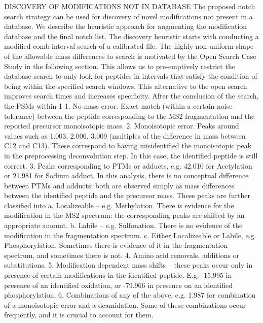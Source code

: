 \documentclass[journal=jprobs,manuscript=article]{achemso}
\begin{document}
DISCOVERY OF MODIFICATIONS NOT IN DATABASE
The proposed notch search strategy can be used for discovery of novel modifications not present in a database. We describe the heuristic approach for augmenting the modification database and the final notch list. 
The discovery heuristic starts with conducting a modified comb interval search of a calibrated file. The highly non-uniform shape of the allowable mass differences to search is motivated by the Open Search Case Study in the following section. This allows us to pre-emptively restrict the database search to only look for peptides in intervals that satisfy the condition of being within the specified search windows. This alternative to the open search improves search times and increases specificity.
After the conclusion of the search, the PSMs within 1%
1.	No mass error. Exact match (within a certain noise tolerance) between the peptide corresponding to the MS2 fragmentation and the reported precursor monoisotopic mass.
2.	Monoisotopic error. Peaks around values such as 1.003, 2.006, 3.009 (multiples of the difference in mass between C12 and C13). These correspond to having misidentified the monoisotopic peak in the preprocessing deconvolution step. In this case, the identified peptide is still correct. 
3.	Peaks corresponding to PTMs or adducts, e.g. 42.010 for Acetylation or 21.981 for Sodium adduct. In this analysis, there is no conceptual difference between PTMs and adducts: both are observed simply as mass differences between the identified peptide and the precursor mass.  These peaks are further classified into
a.	Localizeable – e.g. Methylation. There is evidence for the modification in the MS2 spectrum: the corresponding peaks are shifted by an appropriate amount. 
b.	Labile – e.g. Sulfonation. There is no evidence of the modification in the fragmentation spectrum. 
c.	Either Localizeable or Labile, e.g. Phosphorylation. Sometimes there is evidence of it in the fragmentation spectrum, and sometimes there is not. 
4.	Amino acid removals, additions or substitutions.
5.	Modification dependent mass shifts – these peaks occur only in presence of certain modifications in the identified peptide. 	E.g. -15.995 in presence of an identified oxidation, or -79.966 in presence on an identified phosphorylation. 
6.	Combinations of any of the above, e.g. 1.987 for combination of a monoisotopic error and a deamidation. Some of these combinations occur frequently, and it is crucial to account for them. 
\end{document}
